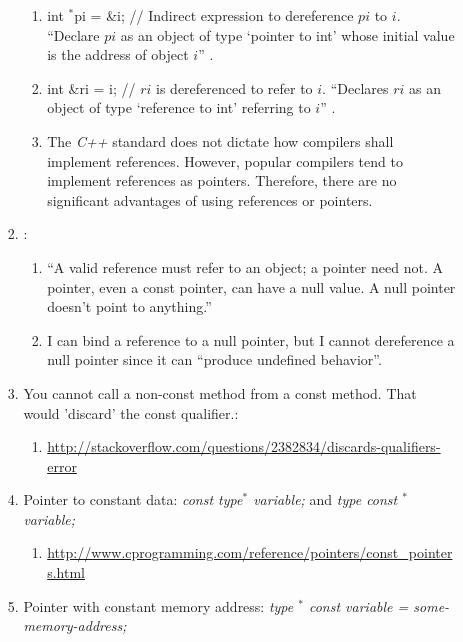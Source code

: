 \begin{enumerate}
\begin{enumerate}
\begin{enumerate}
			\begin{enumerate} \itemsep -1pt
			\item int $^{\ast}$pi = {\&}i; // Indirect expression to dereference $pi$ to $i$. ``Declare $pi$ as an object of type `pointer to int' whose initial value is the address of object $i$'' \cite{Saks2001a}.
			\item int {\&}ri = i; // $ri$ is dereferenced to refer to $i$. ``Declares $ri$ as an object of type `reference to int' referring to $i$'' \cite{Saks2001a}.
			\item The {\it C++} standard does not dictate how compilers shall implement references. However, popular compilers tend to implement references as pointers. Therefore, there are no significant advantages of using references or pointers.
			\end{enumerate}
		\item \cite{Saks2001a}: \vspace{-0.1cm}
			\begin{enumerate} \itemsep -1pt
			\item ``A valid reference must refer to an object; a pointer need not. A pointer, even a const pointer, can have a null value. A null pointer doesn't point to anything.''
			\item I can bind a reference to a null pointer, but I cannot dereference a null pointer since it can ``produce undefined behavior''.
			\end{enumerate}
		\item You cannot call a non-const method from a const method. That would 'discard' the const qualifier.: \vspace{-0.1cm}
			\begin{enumerate} \itemsep -1pt
			\item \url{http://stackoverflow.com/questions/2382834/discards-qualifiers-error}
			\end{enumerate}
		\item Pointer to constant data: {\it const type$^{\ast}$ variable;} and {\it type const $^{\ast}$ variable;} \vspace{-0.1cm}
			\begin{enumerate} \itemsep -1pt
			\item \url{http://www.cprogramming.com/reference/pointers/const_pointers.html}
			\end{enumerate}
		\item Pointer with constant memory address: {\it type $^{\ast}$ const variable = some-memory-address;} \vspace{-0.1cm}

\end{enumerate}
\end{enumerate}
\end{enumerate}
